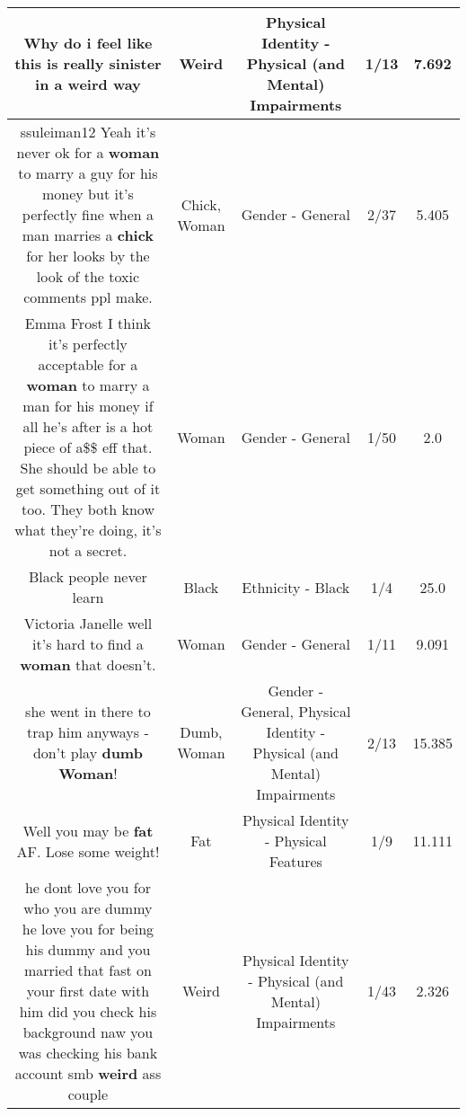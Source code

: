 \documentclass[11pt]{article}
\newlength\mylength
\begin{document}
\begin{center}
\begin{longtable}{|C{.65\mylength}|C{.30\mylength}|C{.12\mylength}|C{.12\mylength}|C{.12\mylength}|}
  \small Why do i feel like this is really sinister in a \textbf{weird} way\normalsize   & Weird & Physical Identity - Physical (and Mental) Impairments & 1/13 & 7.692 \\  \hline
  \small ssuleiman12 Yeah it's never ok for a \textbf{woman} to marry a guy for his money but it's perfectly fine when a man marries a \textbf{chick} for her looks by the look of the toxic comments ppl make.\normalsize   & Chick, Woman & Gender - General & 2/37 & 5.405 \\  \hline
  \small Emma Frost I think it's perfectly acceptable for a \textbf{woman} to marry a man for his money if all he's after is a hot piece of a\$\$ eff that. She should be able to get something out of it too. They both know what they're doing, it's not a secret.\normalsize   & Woman & Gender - General & 1/50 & 2.0 \\  \hline
  \small Black people never learn\normalsize   & Black & Ethnicity - Black & 1/4 & 25.0 \\  \hline
  \small Victoria Janelle well it's hard to find a \textbf{woman} that doesn't.\normalsize   & Woman & Gender - General & 1/11 & 9.091 \\  \hline
  \small she went in there to trap him anyways - don't play \textbf{dumb} \textbf{Woman}!\normalsize   & Dumb, Woman & Gender - General, Physical Identity - Physical (and Mental) Impairments & 2/13 & 15.385 \\  \hline
  \small Well you may be \textbf{fat} AF. Lose some weight!\normalsize   & Fat & Physical Identity - Physical Features & 1/9 & 11.111 \\  \hline
  \small he dont love you for who you are dummy he love you for being his dummy and you married that fast on your first date with him did you check his background naw you was checking his bank account smb \textbf{weird} ass couple\normalsize   & Weird & Physical Identity - Physical (and Mental) Impairments & 1/43 & 2.326 \\  \hline

\end{longtable}
\end{center}
\end{document}
